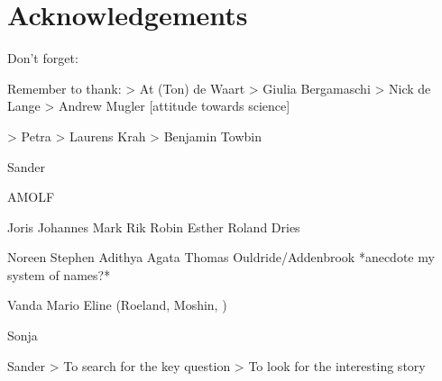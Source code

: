 



\chapter*{Acknowledgements}

Don't forget:



Remember to thank:
> At (Ton) de Waart
> Giulia Bergamaschi
> Nick de Lange
> Andrew Mugler [attitude towards science]

> Petra
> Laurens Krah
> Benjamin Towbin

Sander

AMOLF

Joris
Johannes
Mark
Rik
Robin
Esther
Roland Dries

Noreen
Stephen
Adithya
Agata
Thomas Ouldride/Addenbrook *anecdote my system of names?*

Vanda
Mario
Eline
(Roeland, Moshin, )

Sonja










Sander
> To search for the key question
> To look for the interesting story







